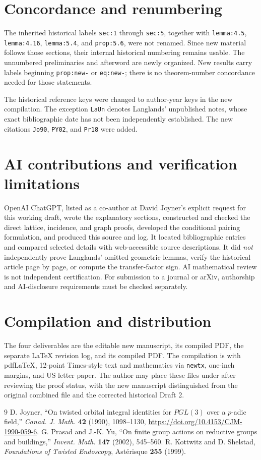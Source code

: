 \documentclass[12pt,letterpaper]{amsart}
\begin{document}
\section{Concordance and renumbering}
The inherited historical labels \texttt{sec:1} through
\texttt{sec:5}, together with \texttt{lemma:4.5},
\texttt{lemma:4.16}, \texttt{lemma:5.4}, and
\texttt{prop:5.6}, were not renamed. Since new material follows
those sections, their internal historical numbering remains
usable. The unnumbered preliminaries and afterword are newly
organized. New results carry labels beginning
\texttt{prop:new-} or \texttt{eq:new-}; there is no
theorem-number concordance needed for those statements.

The historical reference keys were changed to author-year keys in
the new compilation. The exception \texttt{LaUn} denotes Langlands'
unpublished notes, whose exact bibliographic date has not been
independently established. The new citations
\texttt{Jo90}, \texttt{PY02}, and \texttt{Pr18} were added.

\section{AI contributions and verification limitations}
OpenAI ChatGPT, listed as a co-author at David Joyner's explicit
request for this working draft, wrote the explanatory sections,
constructed and checked the direct lattice, incidence, and graph
proofs, developed the conditional pairing formulation, and produced
this source and log. It located bibliographic entries and compared
selected details with web-accessible source descriptions. It did
\emph{not} independently prove Langlands' omitted geometric lemmas,
verify the historical article page by page, or compute the
transfer-factor sign. AI mathematical review is not independent
certification. For submission to a journal or arXiv, authorship
and AI-disclosure requirements must be checked separately.

\section{Compilation and distribution}
The four deliverables are the editable new manuscript, its compiled
PDF, the separate LaTeX revision log, and its compiled PDF.
The compilation is with pdfLaTeX, 12-point Times-style text
and mathematics via \texttt{newtx}, one-inch margins,
and US letter paper. The author may place these files under
 after reviewing the
proof status, with the new manuscript distinguished from the
original combined file and the corrected historical Draft 2.

\begin{thebibliography}{9}
D. Joyner, ``On twisted orbital integral identities for $PGL(3)$ over
a $p$-adic field,'' \emph{Canad. J. Math.} \textbf{42} (1990),
1098--1130, \url{https://doi.org/10.4153/CJM-1990-059-6}.
G. Prasad and J.-K. Yu, ``On finite group actions on reductive groups
and buildings,'' \emph{Invent. Math.} \textbf{147} (2002), 545--560.
R. Kottwitz and D. Shelstad, \emph{Foundations of Twisted Endoscopy},
Ast\'erisque \textbf{255} (1999).
\end{thebibliography}
\end{document}
